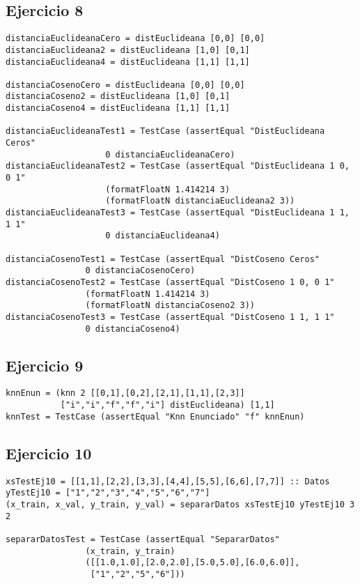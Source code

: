 \documentclass[spanish, 10pt,a4paper]{article}
\numberwithin{equation}{section} %
\begin{document}
\subsection{Ejercicio 8}
\begin{lstlisting}
distanciaEuclideanaCero = distEuclideana [0,0] [0,0]
distanciaEuclideana2 = distEuclideana [1,0] [0,1]
distanciaEuclideana4 = distEuclideana [1,1] [1,1]

distanciaCosenoCero = distEuclideana [0,0] [0,0]
distanciaCoseno2 = distEuclideana [1,0] [0,1]
distanciaCoseno4 = distEuclideana [1,1] [1,1]

distanciaEuclideanaTest1 = TestCase (assertEqual "DistEuclideana Ceros" 
				    0 distanciaEuclideanaCero)
distanciaEuclideanaTest2 = TestCase (assertEqual "DistEuclideana 1 0, 0 1" 
				    (formatFloatN 1.414214 3) 
				    (formatFloatN distanciaEuclideana2 3))
distanciaEuclideanaTest3 = TestCase (assertEqual "DistEuclideana 1 1, 1 1" 
				    0 distanciaEuclideana4)

distanciaCosenoTest1 = TestCase (assertEqual "DistCoseno Ceros" 
				0 distanciaCosenoCero)
distanciaCosenoTest2 = TestCase (assertEqual "DistCoseno 1 0, 0 1" 
				(formatFloatN 1.414214 3) 
				(formatFloatN distanciaCoseno2 3))
distanciaCosenoTest3 = TestCase (assertEqual "DistCoseno 1 1, 1 1" 
				0 distanciaCoseno4)
\end{lstlisting}

\subsection{Ejercicio 9}
\begin{lstlisting}
knnEnun = (knn 2 [[0,1],[0,2],[2,1],[1,1],[2,3]] 
	       ["i","i","f","f","i"] distEuclideana) [1,1]
knnTest = TestCase (assertEqual "Knn Enunciado" "f" knnEnun)
\end{lstlisting}

\subsection{Ejercicio 10}
\begin{lstlisting}
xsTestEj10 = [[1,1],[2,2],[3,3],[4,4],[5,5],[6,6],[7,7]] :: Datos
yTestEj10 = ["1","2","3","4","5","6","7"]
(x_train, x_val, y_train, y_val) = separarDatos xsTestEj10 yTestEj10 3 2

separarDatosTest = TestCase (assertEqual "SepararDatos" 
			    (x_train, y_train) 
			    ([[1.0,1.0],[2.0,2.0],[5.0,5.0],[6.0,6.0]],
			     ["1","2","5","6"]))
\end{lstlisting}
\end{document}
